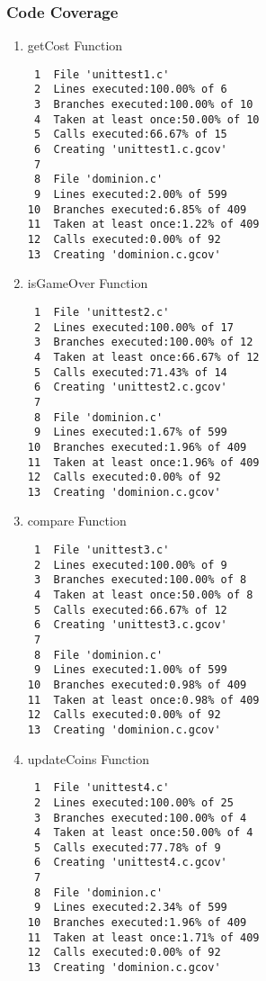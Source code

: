 \documentclass[11pt]{article}
\begin{document}
\subsubsection{Code Coverage}
\label{sec:codecoverage}

\begin{enumerate}
\item getCost Function
\label{sec:getcostfunction1}
\begin{verbatim}
 1  File 'unittest1.c'
 2  Lines executed:100.00% of 6
 3  Branches executed:100.00% of 10
 4  Taken at least once:50.00% of 10
 5  Calls executed:66.67% of 15
 6  Creating 'unittest1.c.gcov'
 7  
 8  File 'dominion.c'
 9  Lines executed:2.00% of 599
10  Branches executed:6.85% of 409
11  Taken at least once:1.22% of 409
12  Calls executed:0.00% of 92
13  Creating 'dominion.c.gcov'
\end{verbatim}

\item isGameOver Function
\label{sec:isgameoverfunction1}
\begin{verbatim}
 1  File 'unittest2.c'
 2  Lines executed:100.00% of 17
 3  Branches executed:100.00% of 12
 4  Taken at least once:66.67% of 12
 5  Calls executed:71.43% of 14
 6  Creating 'unittest2.c.gcov'
 7  
 8  File 'dominion.c'
 9  Lines executed:1.67% of 599
10  Branches executed:1.96% of 409
11  Taken at least once:1.96% of 409
12  Calls executed:0.00% of 92
13  Creating 'dominion.c.gcov'
\end{verbatim}

\item compare Function
\label{sec:comparefunction1}
\begin{verbatim}
 1  File 'unittest3.c'
 2  Lines executed:100.00% of 9
 3  Branches executed:100.00% of 8
 4  Taken at least once:50.00% of 8
 5  Calls executed:66.67% of 12
 6  Creating 'unittest3.c.gcov'
 7  
 8  File 'dominion.c'
 9  Lines executed:1.00% of 599
10  Branches executed:0.98% of 409
11  Taken at least once:0.98% of 409
12  Calls executed:0.00% of 92
13  Creating 'dominion.c.gcov'
\end{verbatim}

\item updateCoins Function
\label{sec:updatecoinsfunction1}
\begin{verbatim}
 1  File 'unittest4.c'
 2  Lines executed:100.00% of 25
 3  Branches executed:100.00% of 4
 4  Taken at least once:50.00% of 4
 5  Calls executed:77.78% of 9
 6  Creating 'unittest4.c.gcov'
 7  
 8  File 'dominion.c'
 9  Lines executed:2.34% of 599
10  Branches executed:1.96% of 409
11  Taken at least once:1.71% of 409
12  Calls executed:0.00% of 92
13  Creating 'dominion.c.gcov'
\end{verbatim}


\end{enumerate}
\end{document}
